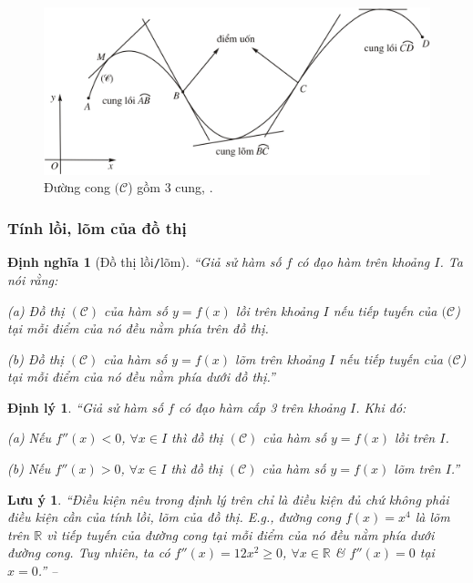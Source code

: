 \documentclass{article}
\numberwithin{equation}{section}
\newtheorem{dinhnghia}{Định nghĩa}[section]
\newtheorem{luuy}{Lưu ý}[section]
\newtheorem{dinhly}{Định lý}[section]
\begin{document}
\begin{figure}[H]
	\centering
	\includegraphics[scale=0.2]{duong_cong_3_cung}
	\caption{Đường cong $(\mathcal{C}$) gồm 3 cung, \cite[Hình 1.22, p. 59]{SGK_Toan_12_giai_tich_nang_cao}.}
	\label{fig:duong_cong_3_cung}
\end{figure}

\subsubsection{Tính lồi, lõm của đồ thị}

\begin{dinhnghia}[Đồ thị lồi\texttt{/}lõm]
	``Giả sử hàm số $f$ có đạo hàm trên khoảng $I$. Ta nói rằng:
	\begin{enumerate*}
		\item[(a)] Đồ thị $(\mathcal{C})$ của hàm số $y = f(x)$ lồi trên khoảng $I$ nếu tiếp tuyến của $(\mathcal{C}$) tại mỗi điểm của nó đều nằm phía trên đồ thị.
		\item[(b)] Đồ thị $(\mathcal{C})$ của hàm số $y = f(x)$ lõm trên khoảng $I$ nếu tiếp tuyến của $(\mathcal{C}$) tại mỗi điểm của nó đều nằm phía dưới đồ thị.''
	\end{enumerate*}
\end{dinhnghia}

\begin{dinhly}
	``Giả sử hàm số $f$ có đạo hàm cấp 3 trên khoảng $I$. Khi đó:
	\begin{enumerate*}
		\item[(a)] Nếu $f''(x) < 0$, $\forall x\in I$ thì đồ thị $(\mathcal{C})$ của hàm số $y = f(x)$ lồi trên $I$.
		\item[(b)] Nếu $f''(x) > 0$, $\forall x\in I$ thì đồ thị $(\mathcal{C})$ của hàm số $y = f(x)$ lõm trên $I$.''
	\end{enumerate*}
\end{dinhly}

\begin{luuy}
	``Điều kiện nêu trong định lý trên chỉ là điều kiện đủ chứ không phải điều kiện cần của tính lồi, lõm của đồ thị. E.g., đường cong $f(x) = x^4$ là lõm trên $\mathbb{R}$ vì tiếp tuyến của đường cong tại mỗi điểm của nó đều nằm phía dưới đường cong. Tuy nhiên, ta có $f''(x) = 12x^2\ge 0$, $\forall x\in\mathbb{R}$ \& $f''(x) = 0$ tại $x = 0$.'' -- \cite[pp. 59--60]{SGK_Toan_12_giai_tich_nang_cao}
\end{luuy}
\end{document}
